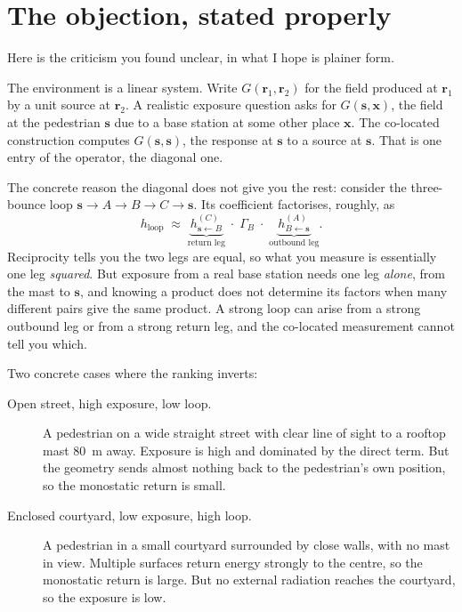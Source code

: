 \documentclass[11pt,a4paper]{article}
\newcommand{\bs}{\mathbf{s}}
\begin{document}
\section{The objection, stated properly}

Here is the criticism you found unclear, in what I hope is plainer form.

The environment is a linear system. Write $G(\mathbf{r}_1, \mathbf{r}_2)$ for the
field produced at $\mathbf{r}_1$ by a unit source at $\mathbf{r}_2$. A realistic
exposure question asks for $G(\bs, \mathbf{x})$, the field at the pedestrian
$\bs$ due to a base station at some other place $\mathbf{x}$. The co-located
construction computes $G(\bs,\bs)$, the response at $\bs$ to a source at $\bs$.
That is one entry of the operator, the diagonal one.

The concrete reason the diagonal does not give you the rest: consider the
three-bounce loop $\bs \to A \to B \to C \to \bs$. Its coefficient factorises,
roughly, as
\begin{equation}
  h_{\text{loop}} \;\approx\; \underbrace{h_{\bs \leftarrow B}^{(C)}}_{\text{return leg}}
  \;\cdot\; \Gamma_B \;\cdot\;
  \underbrace{h_{B \leftarrow \bs}^{(A)}}_{\text{outbound leg}} .
\end{equation}
Reciprocity tells you the two legs are equal, so what you measure is essentially
one leg \emph{squared}. But exposure from a real base station needs one leg
\emph{alone}, from the mast to $\bs$, and knowing a product does not determine
its factors when many different pairs give the same product. A strong loop can
arise from a strong outbound leg or from a strong return leg, and the co-located
measurement cannot tell you which.

Two concrete cases where the ranking inverts:

\begin{description}
\item[Open street, high exposure, low loop.] A pedestrian on a wide straight
      street with clear line of sight to a rooftop mast $80$~m away. Exposure is
      high and dominated by the direct term. But the geometry sends almost nothing
      back to the pedestrian's own position, so the monostatic return is small.
\item[Enclosed courtyard, low exposure, high loop.] A pedestrian in a small
      courtyard surrounded by close walls, with no mast in view. Multiple surfaces
      return energy strongly to the centre, so the monostatic return is large. But
      no external radiation reaches the courtyard, so the exposure is low.
\end{description}
\end{document}
